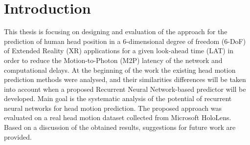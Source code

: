 \chapter{Introduction}
\label{sec:intro}
This thesis is focusing on designing and evaluation of the approach for the prediction of human head position in a 6-dimensional degree of freedom (6-DoF) of Extended Reality (XR) applications for a given look-ahead time (LAT) in order to reduce the Motion-to-Photon (M2P) latency of the network and computational delays. At the beginning of the work the existing head motion prediction methods were analysed, and their similarities differences will be taken into account when a proposed Recurrent Neural Network-based predictor will be developed. Main goal is the systematic analysis of the potential of recurrent neural networks for head motion prediction. The proposed approach was evaluated on a real head motion dataset collected from Microsoft HoloLens. Based on a discussion of the obtained results, suggestions for future work are provided.

